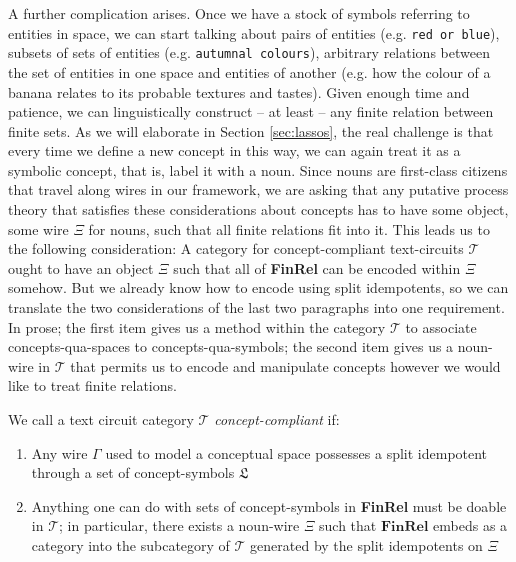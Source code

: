 \begin{fullwidth}
A further complication arises. Once we have a stock of symbols referring to entities in space, we can start talking about pairs of entities (e.g. \texttt{red or blue}), subsets of sets of entities (e.g. \texttt{autumnal colours}), arbitrary relations between the set of entities in one space and entities of another (e.g. how the colour of a banana relates to its probable textures and tastes). Given enough time and patience, we can linguistically construct -- at least -- any finite relation between finite sets. As we will elaborate in Section \ref{sec:lassos}, the real challenge is that every time we define a new concept in this way, we can again treat it as a symbolic concept, that is, label it with a noun. Since nouns are first-class citizens that travel along wires in our framework, we are asking that any putative process theory that satisfies these considerations about concepts has to have some object, some wire $\Xi$ for nouns, such that all finite relations fit into it. This leads us to the following consideration: A category for concept-compliant text-circuits $\mathcal{T}$ ought to have an object $\Xi$ such that all of \textbf{FinRel} can be encoded within $\Xi$ somehow. But we already know how to encode using split idempotents, so we can translate the two considerations of the last two paragraphs into one requirement. In prose; the first item gives us a method within the category $\mathcal{T}$ to associate concepts-qua-spaces to concepts-qua-symbols; the second item gives us a noun-wire in $\mathcal{T}$ that permits us to encode and manipulate concepts however we would like to treat finite relations.

\begin{requirement}
We call a text circuit category $\mathcal{T}$ \emph{concept-compliant} if:
\begin{enumerate}
\item{Any wire $\Gamma$ used to model a conceptual space possesses a split idempotent through a set of concept-symbols $\mathfrak{L}$}
\item{Anything one can do with sets of concept-symbols in \textbf{FinRel} must be doable in $\mathcal{T}$; in particular, there exists a noun-wire $\Xi$ such that $\textbf{FinRel}$ embeds as a category into the subcategory of $\mathcal{T}$ generated by the split idempotents on $\Xi$}
\end{enumerate}
\end{requirement}



\end{fullwidth}
